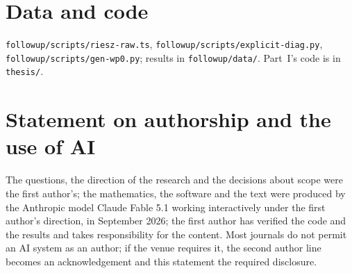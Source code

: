 \documentclass[11pt,a4paper]{article}
\theoremstyle{remark}\newtheorem{remark}[theorem]{Remark}
\begin{document}
\section*{Data and code}
\texttt{followup/scripts/riesz-raw.ts}, \texttt{followup/scripts/explicit-diag.py},
\texttt{followup/scripts/gen-wp0.py}; results in \texttt{followup/data/}. Part~I's code is in \texttt{thesis/}.

\section*{Statement on authorship and the use of AI}
The questions, the direction of the research and the decisions about scope were the first author's; the
mathematics, the software and the text were produced by the Anthropic model Claude Fable 5.1 working
interactively under the first author's direction, in September 2026; the first author has verified the
code and the results and takes responsibility for the content. Most journals do not permit an AI system as
an author; if the venue requires it, the second author line becomes an acknowledgement and this statement
the required disclosure.



\end{document}
